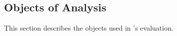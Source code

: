 \documentclass[sigconf,review, anonymous]{acmart}
\begin{document}

\newcommand{\numNonContentAttacks}{5}
\newcommand{\numContentAttacks}{10}

\subsection{Objects of Analysis}
\label{sec:dataset-benign}
\label{attack-reproduction}

This section describes the objects used in \tname{}'s evaluation.

\vspace{1ex}
\end{document}
